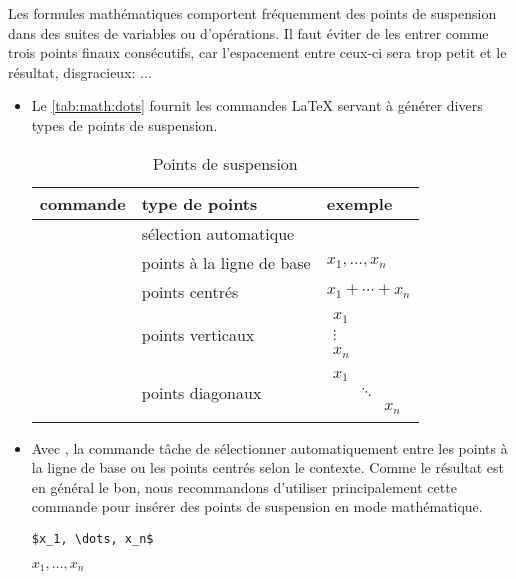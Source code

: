 Les formules mathématiques comportent fréquemment des points de
suspension dans des suites de variables ou d'opérations. Il faut
éviter de les entrer comme trois points finaux consécutifs, car
l'espacement entre ceux-ci sera trop petit et le résultat,
disgracieux: $...$

\begin{itemize}
\item Le \autoref{tab:math:dots} fournit les commandes {\LaTeX}
  servant à générer divers types de points de suspension.
  \begin{table}
    \caption{Points de suspension}
    \label{tab:math:dots}
    \centering
    \begin{tabular}{lll}
      \toprule
      commande & type de points & exemple \\
      \midrule
      \cmd{\dots} &  sélection automatique \\
      \cmd{\ldots} & points à la ligne de base & $x_1, \ldots, x_n$ \\
      \cmd{\cdots} & points centrés & $x_1 + \cdots + x_n$ \\
      \cmd{\vdots} & points verticaux & $
                                        \begin{matrix}
                                          x_1 \\ \vdots \\ x_n
                                        \end{matrix}$ \\
      \cmd{\ddots} & points diagonaux & $
                                        \begin{matrix}
                                          x_1 &&\\ &\ddots& \\ && x_n
                                        \end{matrix}$ \\
      \bottomrule
    \end{tabular}
  \end{table}
\item Avec , la commande \cmd{\dots} tâche de
  sélectionner automatiquement entre les points à la ligne de base ou
  les points centrés selon le contexte. Comme le résultat est en
  général le bon, nous recommandons d'utiliser principalement cette
  commande pour insérer des points de suspension en mode mathématique.
  \begin{demo}
    \begin{texample}
\begin{lstlisting}
$x_1, \dots, x_n$
\end{lstlisting}
      \producing
      $x_1, \dots, x_n$
    \end{texample}


\end{demo}
\end{itemize}

